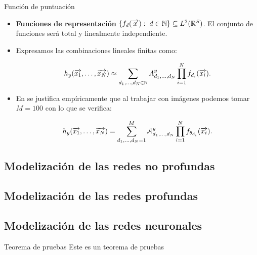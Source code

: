 \begin{frame}{Función de puntuación}

	\begin{itemize}
		\item \textbf{Funciones de representación} $\{ f_d(\overrightarrow{x}): \; d \in \mathbb{N} \} \subseteq L^2(\mathbb{R}^S)$. El conjunto de funciones será total y linealmente independiente.
		\item Expresamos las combinaciones lineales finitas como:

		      \begin{equation} \label{eq:hipotesis_en_general}
			      h_y(\overrightarrow{x_1}, \ldots, \overrightarrow{x_N}) \approx \sum_{d_1, \ldots, d_N \in \mathbb{N}} A^y_{d_1, \ldots, d_N} \prod_{i = 1}^N f_{d_i}(\overrightarrow{x_i}).
		      \end{equation}
		\item En \cite{matematicas:principal} se justifica empíricamente que al trabajar con imágenes podemos tomar $M=100$ con lo que se verifica:

		      \begin{equation} \label{eq:puntuacion_general}
			      h_y(\overrightarrow{x_1}, \ldots, \overrightarrow{x_N}) = \sum_{d_1, \ldots, d_N = 1}^{M} \mathcal{A}^y_{d_1, \ldots, d_N} \prod_{i = 1}^N f_{\theta_{d_i}}(\overrightarrow{x_i}).
		      \end{equation}
	\end{itemize}

\end{frame}

\subsection{Modelización de las redes no profundas}


\subsection{Modelización de las redes profundas}



\subsection{Modelización de las redes neuronales}
\begin{frame}
	\begin{block}{Teorema de pruebas}
		Este es un teorema de pruebas
	\end{block}
\end{frame}

